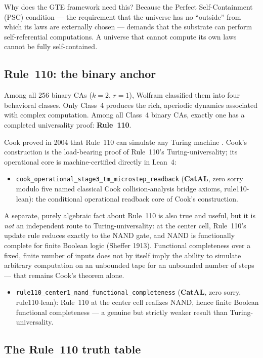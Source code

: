 \documentclass[11pt,a4paper]{article}
\newcommand{\term}[1]{\textbf{#1}}
\newcommand{\lean}[1]{\texttt{#1}}
\newcommand{\CatAL}{\textbf{CatAL}}
\theoremstyle{definition}
\begin{document}
Why does the GTE framework need this?  Because the Perfect Self-Containment
(PSC) condition — the requirement that the universe has no ``outside'' from
which its laws are externally chosen — demands that the substrate can perform
self-referential computations.  A universe that cannot compute its own laws
cannot be fully self-contained.

\subsection{Rule~110: the binary anchor}

Among all 256 binary CAs ($k=2$, $r=1$), Wolfram classified them into four
behavioral classes.  Only Class~4 produces the rich, aperiodic dynamics
associated with complex computation.  Among all Class~4 binary CAs, exactly
one has a completed universality proof: \term{Rule~110}.

Cook proved in 2004 that Rule~110 can simulate any Turing machine
\cite{Cook2004}.  Cook's construction is the load-bearing proof of Rule~110's
Turing-universality; its operational core is machine-certified directly in
Lean~4:
\begin{itemize}
  \item \lean{cook\_operational\_stage3\_tm\_microstep\_readback} (\CatAL,
    zero sorry modulo five named classical Cook collision-analysis bridge
    axioms, rule110-lean): the conditional operational readback core of
    Cook's construction.
\end{itemize}
A separate, purely algebraic fact about Rule~110 is also true and useful, but
it is \emph{not} an independent route to Turing-universality: at the center
cell, Rule~110's update rule reduces exactly to the NAND gate, and NAND is
functionally complete for finite Boolean logic (Sheffer 1913).  Functional
completeness over a fixed, finite number of inputs does not by itself imply
the ability to simulate arbitrary computation on an unbounded tape for an
unbounded number of steps --- that remains Cook's theorem alone.
\begin{itemize}
  \item \lean{rule110\_center1\_nand\_functional\_completeness} (\CatAL, zero
    sorry, rule110-lean): Rule~110 at the center cell realizes NAND, hence
    finite Boolean functional completeness --- a genuine but strictly weaker
    result than Turing-universality.
\end{itemize}

\subsection{The Rule~110 truth table}
\end{document}
